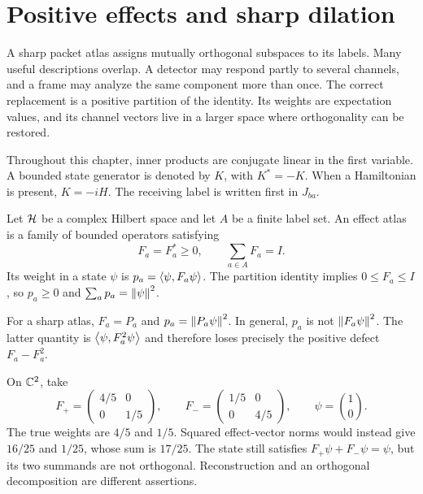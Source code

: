 \section{Positive effects and sharp dilation}
\label{sec:foundation-effects}

A sharp packet atlas assigns mutually orthogonal subspaces to its labels. Many useful descriptions overlap. A detector may respond partly to several channels, and a frame may analyze the same component more than once. The correct replacement is a positive partition of the identity. Its weights are expectation values, and its channel vectors live in a larger space where orthogonality can be restored.

Throughout this chapter, inner products are conjugate linear in the first variable. A bounded state generator is denoted by $K$, with $K^*=-K$. When a Hamiltonian is present, $K=-iH$. The receiving label is written first in $J_{ba}$.

\begin{definition}
Let $\mathcal H$ be a complex Hilbert space and let $A$ be a finite label set. An effect atlas is a family of bounded operators satisfying
\[
 F_a=F_a^*\geq0,\qquad \sum_{a\in A}F_a=I.
\]
Its weight in a state $\psi$ is $p_a=\left\langle\psi,F_a\psi\right\rangle$. The partition identity implies $0\leq F_a\leq I$, so $p_a\geq0$ and $\sum_a p_a=\left\lVert\psi\right\rVert^2$.
\end{definition}

For a sharp atlas, $F_a=P_a$ and $p_a=\left\lVert P_a\psi\right\rVert^2$. In general, $p_a$ is not $\left\lVert F_a\psi\right\rVert^2$. The latter quantity is $\left\langle\psi,F_a^2\psi\right\rangle$ and therefore loses precisely the positive defect $F_a-F_a^2$.

\begin{example}
On $\mathbb C^2$, take
\[
 F_+=\begin{pmatrix}4/5&0\\0&1/5\end{pmatrix},\qquad
 F_-=\begin{pmatrix}1/5&0\\0&4/5\end{pmatrix},\qquad \psi=\binom10.
\]
The true weights are $4/5$ and $1/5$. Squared effect-vector norms would instead give $16/25$ and $1/25$, whose sum is $17/25$. The state still satisfies $F_+\psi+F_-\psi=\psi$, but its two summands are not orthogonal. Reconstruction and an orthogonal decomposition are different assertions.
\end{example}

